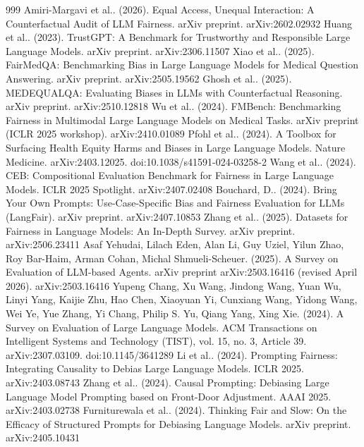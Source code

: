 \documentclass[10pt]{article}
\begin{document}
\begin{thebibliography}{999}
 Amiri-Margavi et al.. (2026). Equal Access, Unequal Interaction: A Counterfactual Audit of LLM Fairness. arXiv preprint. arXiv:2602.02932
 Huang et al.. (2023). TrustGPT: A Benchmark for Trustworthy and Responsible Large Language Models. arXiv preprint. arXiv:2306.11507
 Xiao et al.. (2025). FairMedQA: Benchmarking Bias in Large Language Models for Medical Question Answering. arXiv preprint. arXiv:2505.19562
 Ghosh et al.. (2025). MEDEQUALQA: Evaluating Biases in LLMs with Counterfactual Reasoning. arXiv preprint. arXiv:2510.12818
 Wu et al.. (2024). FMBench: Benchmarking Fairness in Multimodal Large Language Models on Medical Tasks. arXiv preprint (ICLR 2025 workshop). arXiv:2410.01089
 Pfohl et al.. (2024). A Toolbox for Surfacing Health Equity Harms and Biases in Large Language Models. Nature Medicine. arXiv:2403.12025. doi:10.1038/s41591-024-03258-2
 Wang et al.. (2024). CEB: Compositional Evaluation Benchmark for Fairness in Large Language Models. ICLR 2025 Spotlight. arXiv:2407.02408
 Bouchard, D.. (2024). Bring Your Own Prompts: Use-Case-Specific Bias and Fairness Evaluation for LLMs (LangFair). arXiv preprint. arXiv:2407.10853
 Zhang et al.. (2025). Datasets for Fairness in Language Models: An In-Depth Survey. arXiv preprint. arXiv:2506.23411
 Asaf Yehudai, Lilach Eden, Alan Li, Guy Uziel, Yilun Zhao, Roy Bar-Haim, Arman Cohan, Michal Shmueli-Scheuer. (2025). A Survey on Evaluation of LLM-based Agents. arXiv preprint arXiv:2503.16416 (revised April 2026). arXiv:2503.16416
 Yupeng Chang, Xu Wang, Jindong Wang, Yuan Wu, Linyi Yang, Kaijie Zhu, Hao Chen, Xiaoyuan Yi, Cunxiang Wang, Yidong Wang, Wei Ye, Yue Zhang, Yi Chang, Philip S. Yu, Qiang Yang, Xing Xie. (2024). A Survey on Evaluation of Large Language Models. ACM Transactions on Intelligent Systems and Technology (TIST), vol. 15, no. 3, Article 39. arXiv:2307.03109. doi:10.1145/3641289
 Li et al.. (2024). Prompting Fairness: Integrating Causality to Debias Large Language Models. ICLR 2025. arXiv:2403.08743
 Zhang et al.. (2024). Causal Prompting: Debiasing Large Language Model Prompting based on Front-Door Adjustment. AAAI 2025. arXiv:2403.02738
 Furniturewala et al.. (2024). Thinking Fair and Slow: On the Efficacy of Structured Prompts for Debiasing Language Models. arXiv preprint. arXiv:2405.10431

\end{thebibliography}
\end{document}
